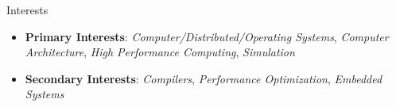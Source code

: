 \begin{rSection}{Interests}
    \begin{itemize}
        \item \textbf{Primary Interests}: \textit{Computer/Distributed/Operating Systems}, \textit{Computer Architecture}, \textit{High Performance Computing}, \textit{Simulation}
        \item \textbf{Secondary Interests}: \textit{Compilers}, \textit{Performance Optimization}, \textit{Embedded Systems} 
    \end{itemize}
\end{rSection}
\vspace*{-0.75\baselineskip}